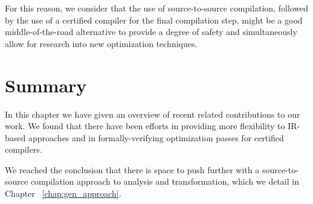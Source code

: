 For this reason, we consider that the use of source-to-source compilation, followed by the use of a certified compiler for the final compilation step, might be a good middle-of-the-road alternative to provide a degree of safety and simultaneously allow for research into new optimization techniques.

\section{Summary}

In this chapter we have given an overview of recent related contributions to our work. We found that there have been efforts in providing more flexibility to IR-based approaches and in formally-verifying optimization passes for certified compilers.

We reached the conclusion that there is space to push further with a source-to-source compilation approach to analysis and transformation, which we detail in Chapter ~\ref{chap:gen_approach}.